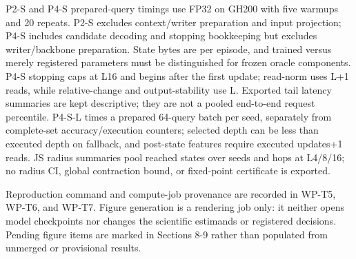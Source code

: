 P2-S and P4-S prepared-query timings use FP32 on GH200 with five warmups and
20 repeats. P2-S excludes context/\allowbreak{}writer preparation and  %
input projection; P4-S includes candidate decoding and stopping bookkeeping but
excludes writer/\allowbreak{}backbone preparation. State bytes are per  %
episode, and trained versus merely registered parameters must be distinguished
for frozen oracle components. P4-S stopping caps at L16 and begins  %
after the first update; read-norm uses L+1 reads, while relative-change and
output-stability use L. Exported tail latency  %
summaries are kept descriptive; they are not a pooled end-to-end request percentile.
P4-S-L times a prepared 64-query batch per seed, separately from complete-set
accuracy/\allowbreak{}execution counters; selected depth can be less than executed depth on
fallback, and post-state features require executed updates+1 reads.  %
JS radius summaries pool reached states over seeds and hops at L4/\allowbreak{}8/\allowbreak{}16; no radius
CI, global contraction bound, or fixed-point certificate is exported.  %

Reproduction command and compute-job provenance are recorded in
WP-T5, WP-T6, and
WP-T7. Figure generation is a rendering job only:
it neither opens model checkpoints nor changes the scientific estimands or
registered decisions. Pending figure items are marked in Sections 8-9 rather
than populated from unmerged or provisional results.


